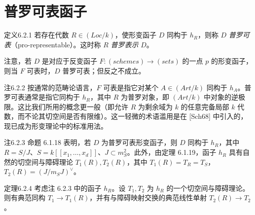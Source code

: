 \section{普罗可表函子}
\begin{origstatement}{定义}{6.2.1}\label{ch06:6.2.1}
若存在代数 $R\in(Loc/k)$，使形变函子 $D$ 同构于 $h_R$，则称 $D$ \emph{普罗可表}（pro-representable）。这时称 $R$ \emph{普罗表示} $D$。
\end{origstatement}
注意，若 $D$ 是对应于反变函子 $F:(schemes)\to(sets)$ 的一点 $p$ 的形变函子，则当 $F$ 可表时，$D$ 普罗可表；但反之不成立。

\begin{origstatement}{注}{6.2.2}\label{ch06:6.2.2}
按通常的范畴论语言，$F$ 可表是指它对某个 $A\in(Art/k)$ 同构于 $h_A$。普罗可表通常是指它同构于 $h_R$，其中 $R$ 为普罗对象，即 $(Art/k)$ 中对象的逆极限。这比我们所用的概念更一般（即允许 $R$ 为剩余域为 $k$ 的任意完备局部 $k$ 代数，而不论其切空间是否有限维）。这一轻微的术语滥用是在 [Sch68] 中引入的，现已成为形变理论中的标准用法。
\end{origstatement}
\begin{origstatement}{注}{6.2.3}\label{ch06:6.2.3}
命题 6.1.18 表明，若 $D$ 为普罗可表形变函子，则 $D$ 同构于 $h_R$，其中 $R=S/J$、$S=k[[x_1,\ldots,x_d]]$、$J\subset m_S^2$。此外，由定理 6.1.19，函子 $h_R$ 具有自然的切空间与障碍理论 $T_1(R),T_2(R)$，其中 $T_1(R)=T_R=T_S$，$T_2(R)=(J/m_SJ)^\vee$。
\end{origstatement}
\begin{origstatement}{定理}{6.2.4}\label{ch06:6.2.4}
考虑注 6.2.3 中的函子 $h_R$。设 $T_1,T_2$ 为 $h_R$ 的一个切空间与障碍理论。则有典范同构 $T_1\to T_1(R)$，并有与障碍映射交换的典范线性单射 $T_2(R)\to T_2$。
\end{origstatement}
